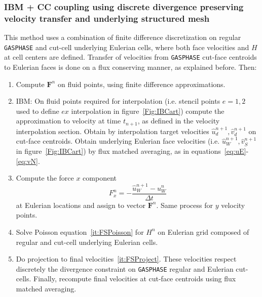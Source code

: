 \documentclass[12pt]{article}
\begin{document}
\subsubsection{IBM + CC coupling using discrete divergence preserving velocity transfer and underlying structured mesh}

This method uses a combination of finite difference discretization on regular \texttt{GASPHASE} and cut-cell underlying Eulerian cells, where both face velocities and $H$ at cell centers are defined. Transfer of velocities from \texttt{GASPHASE} cut-face centroids to Eulerian faces is done on a flux conserving manner, as explained before. Then:
%
\begin{enumerate}

  \item Compute $\mathbf{F}^{n}$ on fluid points, using finite difference approximations.

  \item IBM: On fluid points required for interpolation (i.e. stencil points $e=1,2$ used to define $ex$ interpolation in figure~\ref{Fig:IBCart}) compute the approximation to velocity at time $t_{n+1}$, as defined in the velocity interpolation section. Obtain by interpolation target velocities $\hat{u}_d^{n+1},\hat{v}_d^{n+1}$ on cut-face centroids. Obtain underlying Eulerian face velocities (i.e. $\hat{u}_W^{n+1},\hat{v}_S^{n+1}$ in figure~\ref{Fig:IBCart}) by flux matched averaging, as in equations~\eqref{eq:uE}-\eqref{eq:vN}.

  \item Compute the force $x$ component
  \begin{equation}
    F_x^n = -\frac{\hat{u}_{W}^{n+1}-u_W^n}{\Delta t}  %
  \end{equation}
   at Eulerian locations and assign to vector $\mathbf{F}^{n}$. Same process for $y$ velocity  points.

  \item Solve Poisson equation~\eqref{it:FSPoisson} for $H^{n}$ on Eulerian grid composed of regular and cut-cell underlying Eulerian cells.
  \item Do projection to final velocities~\eqref{it:FSProject}. These velocities respect discretely the divergence constraint on \texttt{GASPHASE} regular and Eulerian cut-cells. Finally, recompute final velocities at cut-face centroids using flux matched averaging.
\end{enumerate}
%
\end{document}
